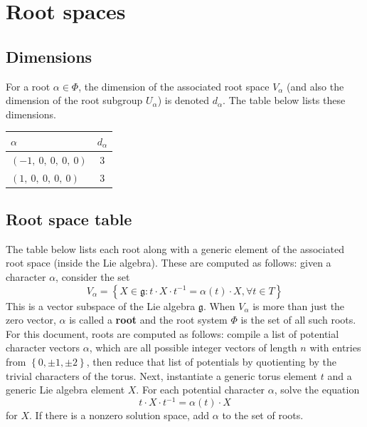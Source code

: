 \documentclass[11pt]{article}
\newcommand{\noi}{\noindent}
\newcommand{\tbf}{\textbf}
\newcommand{\inv}{^{-1}}
\newcommand{\lb}{\left\{}
\newcommand{\rb}{\right\}}
\newcommand{\frakg}{\mathfrak{g}}
\theoremstyle{definition}
\begin{document}
\newpage
\section{Root spaces}

\subsection{Dimensions}

For a root $\alpha \in \Phi$, the dimension of the associated root space $V_\alpha$ (and also the dimension of the root subgroup $U_\alpha$) is denoted $d_\alpha$. The table below lists these dimensions.

\bigskip

\noindent \begin{tabular}{|l|c|}
    \hline
    \textbf{$\alpha$} & \textbf{$d_{\alpha}$} \\
    \hline
    $\left( -1, \  0, \  0, \  0, \  0\right)$ & 3 \\
    \hline
    $\left( 1, \  0, \  0, \  0, \  0\right)$ & 3 \\
    \hline
\end{tabular}


\subsection{Root space table}

\noi The table below lists each root along with a generic element of the associated root space (inside the Lie algebra). These are computed as follows: given a character $\alpha$, consider the set
\[
	V_\alpha = \lb X \in \frakg : t \cdot X \cdot t \inv = \alpha(t) \cdot X, \forall t \in T \rb
\]
This is a vector subspace of the Lie algebra $\frakg$. When $V_\alpha$ is more than just the zero vector, $\alpha$ is called a \tbf{root} and the root system $\Phi$ is the set of all such roots. For this document, roots are computed as follows: compile a list of potential character vectors $\alpha$, which are all possible integer vectors of length $n$ with entries from $\lb 0, \pm 1, \pm 2 \rb$, then reduce that list of potentials by quotienting by the trivial characters of the torus. Next, instantiate a generic torus element $t$ and a generic Lie algebra element $X$. For each potential character $\alpha$, solve the equation
\[
	t \cdot X \cdot t \inv = \alpha(t) \cdot X
\]
for $X$. If there is a nonzero solution space, add $\alpha$ to the set of roots.

\bigskip
\end{document}
